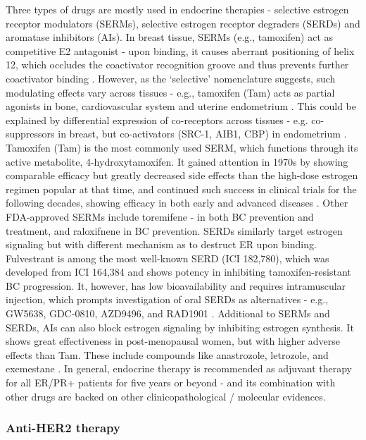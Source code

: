 Three types of drugs are mostly used in endocrine therapies - selective estrogen receptor modulators (SERMs), selective estrogen receptor degraders (SERDs) and aromatase inhibitors (AIs). In breast tissue, SERMs (e.g., tamoxifen) act as competitive E2 antagonist - upon binding, it causes aberrant positioning of helix 12, which occludes the coactivator recognition groove and thus prevents further coactivator binding \citep{shiau1998structural}. However, as the ‘selective’ nomenclature suggests, such modulating effects vary across tissues - e.g., tamoxifen (Tam) acts as partial agonists in bone, cardiovascular system and uterine endometrium \citep{hodges2003tamoxifen}. This could be explained by differential expression of co-receptors across tissues - e.g. co-suppressors in breast, but co-activators (SRC-1, AIB1, CBP) in endometrium  \citep{shang2002molecular}. Tamoxifen (Tam) is the most commonly used SERM, which functions through its active metabolite, 4-hydroxytamoxifen. It gained attention in 1970s by showing comparable efficacy but greatly decreased side effects than the high-dose estrogen regimen popular at that time, and continued such success in clinical trials for the following decades, showing efficacy in both early and advanced diseases \citep{patel2018selective}. Other FDA-approved SERMs include toremifene - in both BC prevention and treatment, and raloxifnene in BC prevention. SERDs similarly target estrogen signaling but with different mechanism as to destruct ER upon binding. Fulvestrant is among the most well-known SERD (ICI 182,780), which was developed from ICI 164,384 and shows potency in inhibiting tamoxifen-resistant BC progression. It, however, has low bioavailability and requires intramuscular injection, which prompts investigation of oral SERDs as alternatives - e.g., GW5638, GDC-0810, AZD9496, and RAD1901 \citep{mcdonnell2015oral}. Additional to SERMs and SERDs, AIs can also block estrogen signaling by inhibiting estrogen synthesis. It shows great effectiveness in post-menopausal women, but with higher adverse effects than Tam. These include compounds like anastrozole, letrozole, and exemestane \citep{smith2003aromatase}. In general, endocrine therapy is recommended as adjuvant therapy for all ER/PR+ patients for five years or beyond - and its combination with other drugs are backed on other clinicopathological / molecular evidences.

\subsubsection{Anti-HER2 therapy}

